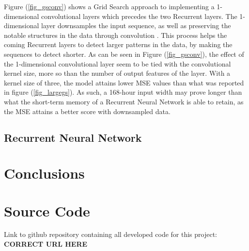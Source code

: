 \documentclass
[twocolumn,
secnumarabic,
nobibnotes,
aps,
prl,
reprint,
groupedaddress,
amsmath,
amssymb,
]{revtex4-2}
\begin{document}
Figure (\ref{fig_gsconv}) shows a Grid Search approach to implementing a 1-dimensional convolutional layers which precedes the two Recurrent layers. The 1-dimensional layer downsamples the input sequence, as well as preserving the notable structures in the data through convolution \cite{Geron2019}. This process helps the coming Recurrent layers to detect larger patterns in the data, by making the sequences to detect shorter. As can be seen in Figure (\ref{fig_gsconv}), the effect of the 1-dimensional convolutional layer seem to be tied with the convolutional kernel size, more so than the number of output features of the layer. With a kernel size of three, the model attains lower MSE values than what was reported in figure (\ref{fig_largegs}). As such, a 168-hour input width may prove longer than what the short-term memory of a Recurrent Neural Network is able to retain, as the MSE attains a better score with downsampled data. 

\subsection{Recurrent Neural Network}

\section{Conclusions}

\appendix

\section{Source Code}
\label{sec:sc}
Link to github repository containing all developed code for this project: \textbf{CORRECT URL HERE}%





\end{document}
